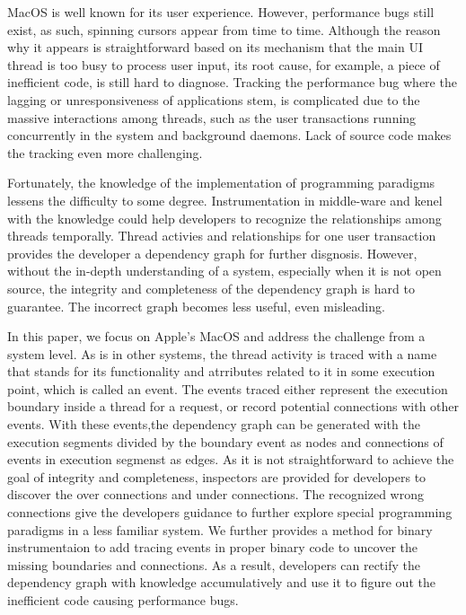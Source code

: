 MacOS is well known for its user experience.
However, performance bugs still exist, as such, spinning cursors appear from time to time.
Although the reason why it appears is straightforward based on its mechanism that the main UI thread is too busy to process user input, its root cause, for example, a piece of inefficient code, is still hard to diagnose.
Tracking the performance bug where the lagging or unresponsiveness of applications stem, is complicated due to the massive interactions among threads, such as the user transactions running concurrently in the system and background daemons.
Lack of source code makes the tracking even more challenging.
\par
Fortunately, the knowledge of the implementation of programming paradigms lessens the difficulty to some degree.
Instrumentation in middle-ware and kenel with the knowledge could help developers to recognize the relationships among threads temporally.
Thread activies and relationships for one user transaction provides the developer a dependency graph for further disgnosis. 
However, without the in-depth understanding of a system, especially when it is not open source, the integrity and completeness of the dependency graph is hard to guarantee.
The incorrect graph becomes less useful, even misleading.
\par
In this paper, we focus on Apple's MacOS and address the challenge from a system level.
As is in other systems, the thread activity is traced with a name that stands for its functionality and atrributes related to it in some execution point, which is called an event.
The events traced either represent the execution boundary inside a thread for a request, or record potential connections with other events. 
With these events,the dependency graph can be generated with the execution segments divided by the boundary event as nodes and connections of events in execution segmenst as edges.
As it is not straightforward to achieve the goal of integrity and completeness, inspectors are provided for developers to discover the over connections and under connections.
The recognized wrong connections give the developers guidance to further explore special programming paradigms in a less familiar system.
We further provides a method for binary instrumentaion to add tracing events in proper binary code to uncover the missing boundaries and connections.
As a result, developers can rectify the dependency graph with knowledge accumulatively and use it to figure out the inefficient code causing performance bugs.


